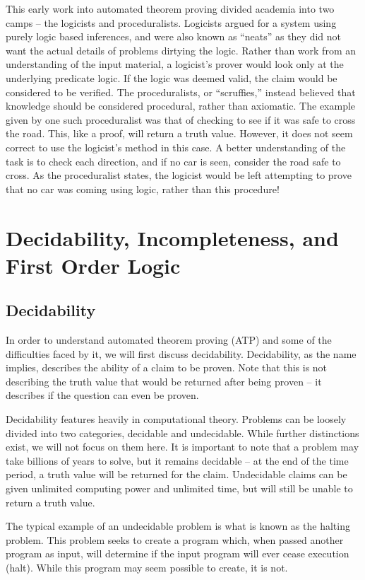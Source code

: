 This early work into automated theorem proving divided academia into two camps -- the logicists and proceduralists. Logicists argued for a system using purely logic based inferences, and were also known as ``neats'' as they did not want the actual details of problems dirtying the logic. Rather than work from an understanding of the input material, a logicist's prover would look only at the underlying predicate logic. If the logic was deemed valid, the claim would be considered to be verified. The proceduralists, or ``scruffies,'' instead believed that knowledge should be considered procedural, rather than axiomatic. The example given by one such proceduralist was that of checking to see if it was safe to cross the road. This, like a proof, will return a truth value. However, it does not seem correct to use the logicist's method in this case. A better understanding of the task is to check each direction, and if no car is seen, consider the road safe to cross. As the proceduralist states, the logicist would be left attempting to prove that no car was coming using logic, rather than this procedure! \cite{ATP History}

\section{Decidability, Incompleteness, and First Order Logic}
\subsection{Decidability}
In order to understand automated theorem proving (ATP) and some of the difficulties faced by it, we will first discuss decidability. Decidability, as the name implies, describes the ability of a claim to be proven. Note that this is not describing the truth value that would be returned after being proven -- it describes if the question can even be proven. 

Decidability features heavily in computational theory. Problems can be loosely divided into two categories, decidable and undecidable. While further distinctions exist, we will not focus on them here. It is important to note that a problem may take billions of years to solve, but it remains decidable -- at the end of the time period, a truth value will be returned for the claim. Undecidable claims can be given unlimited computing power and unlimited time, but will still be unable to return a truth value.

The typical example of an undecidable problem is what is known as the halting problem. This problem seeks to create a program which, when passed another program as input, will determine if the input program will ever cease execution (halt). While this program may seem possible to create, it is not.

